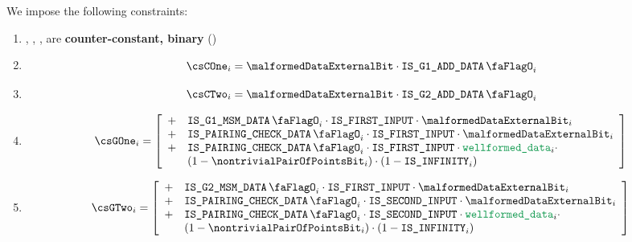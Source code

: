 We impose the following constraints:
\begin{enumerate}
    \item \csCOne{}, \csCTwo{}, \csGOne{}, \csGTwo{} are \textbf{counter-constant, binary} \quad (\trash)
    \item
        \[  
            \csCOne _{i} = \malformedDataExternalBit \cdot \isBlsGOneAddData_{i}
        \]
    \item 
        \[  
            \csCTwo _{i} = \malformedDataExternalBit \cdot \isBlsGTwoAddData_{i}    
        \]
    \item 
        \[
            \csGOne _{i} = 
            \left[ \begin{array}{cl} 
                + & \isBlsGOneMsmData_{i} \cdot \isFirstInput \cdot \malformedDataExternalBit_{i}  \\
                + & \isBlsPairingCheckData_{i} \cdot \isFirstInput \cdot \malformedDataExternalBit_{i} \\
                + & \isBlsPairingCheckData_{i} \cdot \isFirstInput \cdot \locWellformedData_{i} \cdot \\
                & (1 - \nontrivialPairOfPointsBit_{i}) \cdot (1 - \isInfinity_{i}) \\
            \end{array} \right] \\
        \]
    \item 
        \[
            \csGTwo _{i} = 
            \left[ \begin{array}{cl} 
                + & \isBlsGTwoMsmData_{i} \cdot \isFirstInput \cdot \malformedDataExternalBit_{i}  \\
                + & \isBlsPairingCheckData_{i} \cdot \isSecondInput \cdot \malformedDataExternalBit_{i} \\
                + & \isBlsPairingCheckData_{i} \cdot \isSecondInput \cdot \locWellformedData_{i} \cdot \\
                & (1 - \nontrivialPairOfPointsBit_{i}) \cdot (1 - \isInfinity_{i}) \\
            \end{array} \right] \\
        \]
\end{enumerate}
